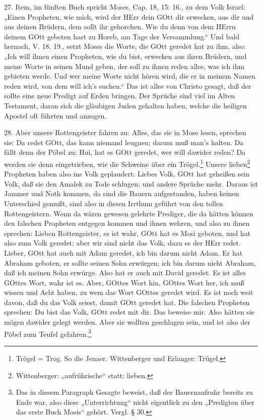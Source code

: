 27. Item, im fünften Buch spricht Moses, Cap. 18, 15: 16., zu dem Volk Israel: „Einen Propheten, wie mich, wird der HErr dein GOtt dir erwecken, aus dir und aus deinen Brüdern, dem sollt ihr gehorchen. Wie du denn von dem HErrn deinem GOtt gebeten hast zu Horeb, am Tage der Versammlung.“ Und bald hernach, V. 18. 19., setzt Moses die Worte, die GOtt geredet hat zu ihm, also: „Ich will ihnen einen Propheten, wie du bist, erwecken aus ihren Brüdern, und meine Worte in seinen Mund geben, der soll zu ihnen reden alles, was ich ihm gebieten werde. Und wer meine Worte nicht hören wird, die er in meinem Namen reden wird, von dem will ich’s suchen.“ Das ist alles von Christo gesagt, daß der sollte eine neue Predigt auf Erden bringen. Der Sprüche sind viel im Alten
Testament, daran sich die gläubigen Juden gehalten haben, welche die heiligen Apostel oft führten und anzogen.

28. Aber unsere Rottengeister fahren zu: Alles, das sie in Mose lesen, sprechen sie: Da redet GOtt, das kann niemand leugnen; darum muß man’s halten. Da fällt denn der Pöbel zu: Hui, hat es GOtt geredet, wer will dawider reden? Da werden sie denn eingetrieben, wie die Schweine über ein Trögel.\footnote{Trögel = Trog. So die Jenaer. Wittenberger und Erlanger: Trügel.} Unsere lieben\footnote{Wittenberger: „aufrührische“ statt: lieben.} Propheten haben also ins Volk geplaudert: Liebes Volk, GOtt hat geheißen sein Volk, daß sie den Amalek zu Tode schlugen; und andere Sprüche mehr. Daraus ist Jammer und Noth kommen, da sind die Bauern aufgestanden, haben keinen Unterschied gemußt, sind also in diesen Irrthum geführt von den tollen Rottengeistern. Wenn da wären gewesen gelehrte Prediger, die da hätten können den falschen Propheten entgegen kommen und ihnen wehren, und also zu ihnen sprechen: Lieben Rottengeister, es ist wahr, GOtt hat es Mosi geboten, und hat also zum Volk geredet; aber wir sind nicht das Volk, dazu es der HErr redet. Lieber, GOtt hat auch mit Adam geredet, ich bin darum nicht Adam. Er hat Abraham geboten, er sollte seinen Sohn erwürgen; ich bin darum nicht Abraham, daß ich meinen Sohn erwürge. Also hat er auch mit David geredet. Es ist alles GOttes Wort, wahr ist es. Aber, GOttes Wort hin, GOttes Wort her, ich muß wissen und Acht haben, zu wem das Wort GOttes geredet wird. Es ist noch weit davon, daß du das Volk seiest, damit GOtt geredet hat. Die falschen Propheten sprechen: Du bist das Volk, GOtt redet mit dir. Das beweise mir. Also hätten sie mögen dawider gelegt werden. Aber sie wollten geschlagen sein, und ist also der Pöbel zum Teufel gefahren.\footnote{Das in diesem Paragraph Gesagte beweist, daß der Bauernaufruhr bereits zu Ende war, also diese „Unterrichtung“ nicht eigentlich zu den „Predigten über das erste Buch Mosis“ gehört. Vergl. § 30.}

